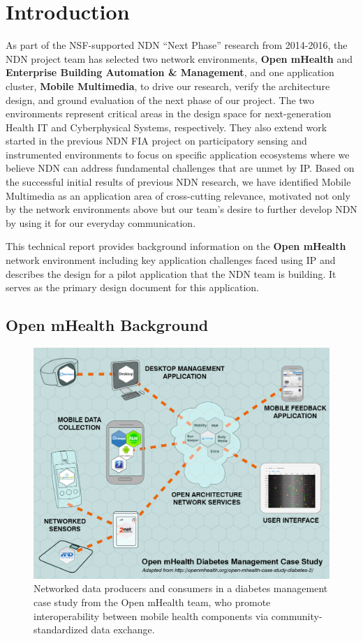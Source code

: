 \section{Introduction}

As part of the NSF-supported NDN ``Next Phase'' research from 2014-2016, 
the NDN project team has selected two network environments, {\bf Open mHealth} and {\bf
Enterprise Building Automation \& Management}, and one application
cluster, {\bf Mobile Multimedia}, to drive our research, verify the
architecture design, and ground evaluation of the next phase of our project.
The two environments represent critical areas in the design space for
next-generation Health IT and Cyberphysical Systems, respectively.  They
also extend work started in the previous NDN FIA project on participatory
sensing and instrumented environments to focus on specific application
ecosystems where we believe NDN can address fundamental challenges that
are unmet by IP.  Based on the successful initial results of previous
NDN research, we have identified Mobile  Multimedia as an application
area of cross-cutting relevance, motivated not only by the
network environments above but our team's desire to further develop
NDN by using it for our everyday communication.

This technical report provides background information on the {\bf Open mHealth}
network environment including key application challenges faced using
IP and describes the design for a pilot application that the NDN team is 
building.  It serves as the primary design document for this application. 

\subsection{Open mHealth Background}

\begin{figure}
\includegraphics[width=.5\textwidth]{figures/OpenmHealth-figure}
\vskip -5pt
\caption{Networked data producers and consumers in a diabetes management case study from the Open mHealth team, who promote interoperability between mobile health components via community-standardized data exchange.~\cite{SimEstrin2010}}
\vskip 6pt
\label{fig:mHealth-diabetes}
\end{figure}

